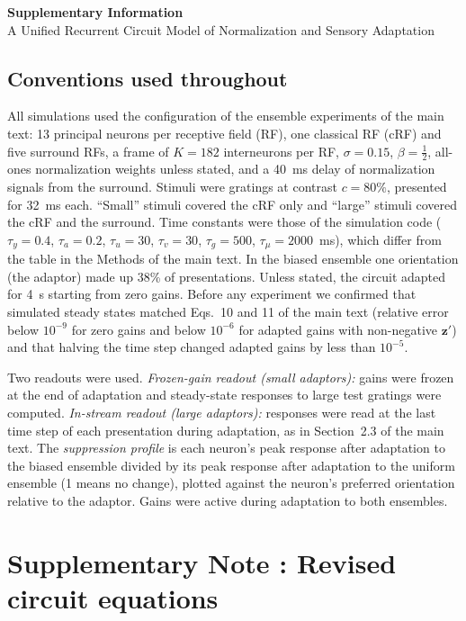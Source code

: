 \documentclass[11pt]{article}
\newcounter{suppnote}
\newcommand{\suppnote}[1]{\refstepcounter{suppnote}\section*{Supplementary Note \arabic{suppnote}: #1}}
\begin{document}
\begin{center}
{\Large\bfseries Supplementary Information}\\[4pt]
{\large A Unified Recurrent Circuit Model of Normalization and Sensory Adaptation}
\end{center}

\subsection*{Conventions used throughout}
All simulations used the configuration of the ensemble experiments of the main text: 13 principal neurons per receptive field (RF), one classical RF (cRF) and five surround RFs, a frame of $K=182$ interneurons per RF, $\sigma=0.15$, $\beta=\tfrac12$, all-ones normalization weights unless stated, and a 40~ms delay of normalization signals from the surround. Stimuli were gratings at contrast $c=80\%$, presented for 32~ms each. ``Small'' stimuli covered the cRF only and ``large'' stimuli covered the cRF and the surround. Time constants were those of the simulation code ($\tau_y=0.4$, $\tau_a=0.2$, $\tau_u=30$, $\tau_v=30$, $\tau_g=500$, $\tau_\mu=2000$~ms), which differ from the table in the Methods of the main text. In the biased ensemble one orientation (the adaptor) made up 38\% of presentations. Unless stated, the circuit adapted for 4~s starting from zero gains. Before any experiment we confirmed that simulated steady states matched Eqs.~10 and 11 of the main text (relative error below $10^{-9}$ for zero gains and below $10^{-6}$ for adapted gains with non-negative $\bm{z}'$) and that halving the time step changed adapted gains by less than $10^{-5}$.

Two readouts were used. \emph{Frozen-gain readout (small adaptors):} gains were frozen at the end of adaptation and steady-state responses to large test gratings were computed. \emph{In-stream readout (large adaptors):} responses were read at the last time step of each presentation during adaptation, as in Section~2.3 of the main text. The \emph{suppression profile} is each neuron's peak response after adaptation to the biased ensemble divided by its peak response after adaptation to the uniform ensemble (1 means no change), plotted against the neuron's preferred orientation relative to the adaptor. Gains were active during adaptation to both ensembles.

\suppnote{Revised circuit equations}
\end{document}
